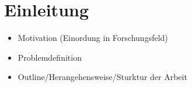 \chapter{Einleitung}

\begin{itemize}
  \item Motivation (Einordung in Forschungsfeld)
  \item Problemdefinition
  \item Outline/Herangehensweise/Sturktur der Arbeit
\end{itemize}
